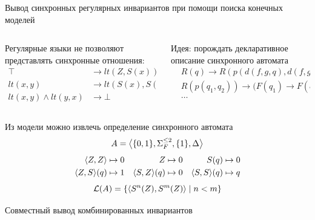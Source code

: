 \whenFullCompile{}

\begin{frame}{Вывод синхронных регулярных инвариантов при помощи поиска конечных моделей}
\begin{columns}
\begin{column}{0.49\textwidth}
\begin{exampleblock}{Регулярные языки не позволяют представлять синхронные отношения:}
\small\vspace*{-10pt}
\begin{align*}
    \top &\rightarrow lt(Z, S(x))\\
    lt(x, y) &\rightarrow lt(S(x), S(y))\\
    lt(x, y) \land lt(y, x) &\rightarrow \bot
\end{align*}
\end{exampleblock}
\end{column}
\begin{column}{0.48\textwidth}
\begin{exampleblock}{Идея: порождать декларативное описание синхронного автомата}
\small\vspace*{-10pt}
\begin{align*}
&R(q) \rightarrow R(p(d(f,g, q), d(f, g, q)))\\
&R(p(q_1, q_2)) \rightarrow \big(F(q_1) \rightarrow F(d(S, S, q_2))\big)\\
&\dots
\end{align*}
\end{exampleblock}
\end{column}
\end{columns}
\vspace*{-15pt}
\begin{varexampleblock}[\textwidth]{Из модели можно извлечь определение синхронного автомата $$A = \big\langle \{0, 1\}, \Sigma_F^{\leq 2}, \{1\}, \Delta \big\rangle$$}
\small\vspace*{-10pt}
\begin{align*}
\langle Z, Z \rangle &\mapsto 0 &Z &\mapsto 0 &S(q) &\mapsto 0\\
\langle Z, S \rangle(q) &\mapsto 1 &\langle S, Z \rangle(q) &\mapsto 0 &\langle S, S \rangle(q) &\mapsto q
\end{align*}
$$\mathcal{L}(A) = \left\{ \langle S^n(Z), S^m(Z) \rangle \mid n < m \right\}$$
\end{varexampleblock}
\end{frame}

\begin{frame}{Совместный вывод комбинированных инвариантов}
\whenFullCompile{\centering\ciciPic}
\end{frame}

